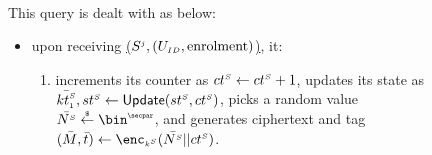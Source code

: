 \begin{figure}[H]
\setlength{\fboxsep}{1pt}
\begin{center}
    \begin{tcolorbox}[enhanced,width=4.7in, left=0.1cm,
    drop fuzzy shadow southwest,
    colframe=black,colback=white]
{\small{

 \\
 
 This query is dealt with as below: 
 
 \begin{itemize}[leftmargin=.4cm]
 \item upon receiving  \underline{\send($S^{\scriptscriptstyle j}, (U_{\scriptscriptstyle ID},  \text{enrolment})$)}, it:
 \begin{enumerate}
 \item  increments its counter as ${ct}^{\scriptscriptstyle S} \gets {ct}^{\scriptscriptstyle S} + 1$, updates its state as $\bar{{kt}^{\scriptscriptstyle S}_{\scriptscriptstyle 1}}, {st}^{\scriptscriptstyle S} \gets \mathsf{Update}({st}^{\scriptscriptstyle S}, {ct}^{\scriptscriptstyle S})$, picks a random value $\bar{\VS{\nonce}} \stackrel{\sss\$}\leftarrow \bin^{\sss\secpar}$, and generates ciphertext and tag   $(\bar M,\bar t) \gets \enc_{\sss\VS{k}}(\bar{\VS{\nonce}}|| \VS{\counter})$. 
 

\end{enumerate}
\end{itemize}}}
\end{tcolorbox}
\end{center}
\end{figure}
